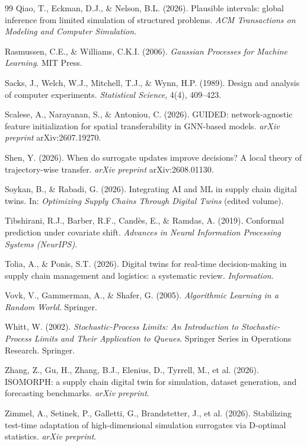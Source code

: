 \documentclass[12pt,a4paper]{article}
\begin{document}
\begin{thebibliography}{99}
 Qiao, T., Eckman, D.J., \& Nelson, B.L. (2026). Plausible intervals: global inference from limited simulation of structured problems. \textit{ACM Transactions on Modeling and Computer Simulation}.

 Rasmussen, C.E., \& Williams, C.K.I. (2006). \textit{Gaussian Processes for Machine Learning}. MIT Press.

 Sacks, J., Welch, W.J., Mitchell, T.J., \& Wynn, H.P. (1989). Design and analysis of computer experiments. \textit{Statistical Science}, 4(4), 409--423.

 Scalese, A., Narayanan, S., \& Antoniou, C. (2026). GUIDED: network-agnostic feature initialization for spatial transferability in GNN-based models. \textit{arXiv preprint} arXiv:2607.19270.

 Shen, Y. (2026). When do surrogate updates improve decisions? A local theory of trajectory-wise transfer. \textit{arXiv preprint} arXiv:2608.01130.

 Soykan, B., \& Rabadi, G. (2026). Integrating AI and ML in supply chain digital twins. In: \textit{Optimizing Supply Chains Through Digital Twins} (edited volume).

 Tibshirani, R.J., Barber, R.F., Cand\`es, E., \& Ramdas, A. (2019). Conformal prediction under covariate shift. \textit{Advances in Neural Information Processing Systems (NeurIPS)}.

 Tolia, A., \& Ponis, S.T. (2026). Digital twins for real-time decision-making in supply chain management and logistics: a systematic review. \textit{Information}.

 Vovk, V., Gammerman, A., \& Shafer, G. (2005). \textit{Algorithmic Learning in a Random World}. Springer.

 Whitt, W. (2002). \textit{Stochastic-Process Limits: An Introduction to Stochastic-Process Limits and Their Application to Queues}. Springer Series in Operations Research. Springer.

 Zhang, Z., Gu, H., Zhang, B.J., Elenius, D., Tyrrell, M., et al. (2026). ISOMORPH: a supply chain digital twin for simulation, dataset generation, and forecasting benchmarks. \textit{arXiv preprint}.

 Zimmel, A., Setinek, P., Galletti, G., Brandstetter, J., et al. (2026). Stabilizing test-time adaptation of high-dimensional simulation surrogates via D-optimal statistics. \textit{arXiv preprint}.

\end{thebibliography}
\end{document}
